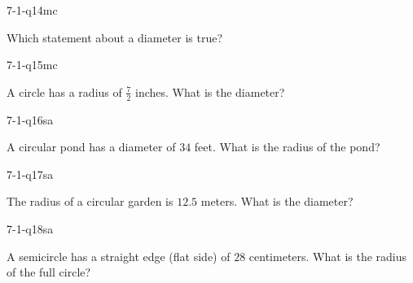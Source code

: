 \begin{practiceQuestion}{7-1-q14}{mc}
\begin{questionText}
Which statement about a diameter is true?
\end{questionText}
\end{practiceQuestion}

\begin{practiceQuestion}{7-1-q15}{mc}
\begin{questionText}
A circle has a radius of $\frac{7}{2}$ inches. What is the diameter?
\end{questionText}
\end{practiceQuestion}


\begin{practiceQuestion}{7-1-q16}{sa}
\begin{questionText}
A circular pond has a diameter of $34$ feet. What is the radius of the pond?
\end{questionText}
\end{practiceQuestion}

\begin{practiceQuestion}{7-1-q17}{sa}
\begin{questionText}
The radius of a circular garden is $12.5$ meters. What is the diameter?
\end{questionText}
\end{practiceQuestion}

\begin{practiceQuestion}{7-1-q18}{sa}
\begin{questionText}
A semicircle has a straight edge (flat side) of $28$ centimeters. What is the radius of the full circle?
\end{questionText}
\end{practiceQuestion}

